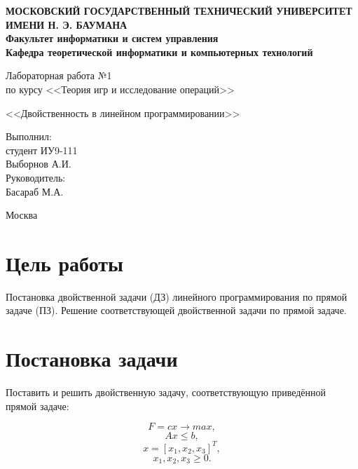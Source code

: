 \documentclass[12pt,a4paper,oneside]{extarticle}
\begin{document}
\pgfplotsset{compat=1.8}

\thispagestyle{empty}
\newpage
{
\centering


\textbf{
МОСКОВСКИЙ ГОСУДАРСТВЕННЫЙ ТЕХНИЧЕСКИЙ УНИВЕРСИТЕТ ИМЕНИ Н. Э. БАУМАНА \\
Факультет информатики и систем управления \\
Кафедра теоретической информатики и компьютерных технологий}
\bigskip
\bigskip
\bigskip
\bigskip
\bigskip
\bigskip
\bigskip

\vfill


Лабораторная работа №1 \\
по курсу <<Теория игр и исследование операций>>

\bigskip

{\large <<Двойственность в линейном программировании>>}
\bigskip

\vfill



\hfill\parbox{4cm} {
Выполнил:\\
студент ИУ9-111 \hfill \\
Выборнов А.И.\hfill \medskip\\
Руководитель:\\
Басараб М.А.\hfill
}


\vspace{\fill}

Москва \number\year
\clearpage
}



\clearpage


\section{Цель работы}
    Постановка двойственной задачи (ДЗ) линейного программирования по прямой задаче (ПЗ). Решение соответствующей двойственной задачи по прямой задаче.

\section{Постановка задачи}
    Поставить и решить двойственную задачу, соответствующую приведённой прямой задаче:
    
    $$F = cx \rightarrow max,$$
    $$Ax \leq b,$$ 
    $$x = [x_1, x_2, x_3]^T,$$
    $$x_1, x_2, x_3 \geq 0.$$
\end{document}
